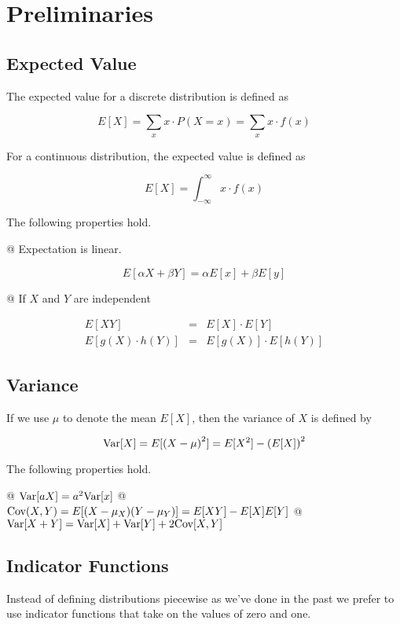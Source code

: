 \section{Preliminaries}
    \subsection{Expected Value}
    The expected value for a discrete distribution is defined as

    \[
        E[X] = \sum_{x} x \cdot P(X = x) = \sum_x x \cdot f(x)
    \]

    For a continuous distribution, the expected value is defined as

    \[
        E[X] = \int_{-\infty}^\infty x \cdot f(x)
    \]

    The following properties hold.

    \begin{easylist}[enumerate]
        @ Expectation is linear.

        \[
            E[\alpha X + \beta Y] = \alpha E[x] + \beta E[y]
        \]

        @ If $X$ and $Y$ are independent

        \[
            \begin{aligned}
                E[XY] &=& E[X] \cdot E[Y]\\
                E[g(X) \cdot h(Y)] &=& E[g(X)] \cdot E[h(Y)]
            \end{aligned}
        \]
    \end{easylist}

    \subsection{Variance}
    If we use $\mu$ to denote the mean $E[X]$, then the variance of $X$ is defined by

    \[
        \text{Var}[X] = E[{(X - \mu)}^2] = E[X^2] - {(E[X])}^2
    \]

    The following properties hold.

    \begin{easylist}[enumerate]
        @ $\text{Var}[a X] = a^2 \text{Var}[x]$
        @ $ \text{Cov}(X, Y) = E[(X - \mu_X)(Y - \mu_Y)] = E[XY] - E[X]E[Y] $
        @ $ \text{Var}[X + Y] = \text{Var}[X] + \text{Var}[Y] + 2 \text{Cov}[X, Y] $
    \end{easylist}

    \subsection{Indicator Functions}
    Instead of defining distributions piecewise as we've done in the past we prefer to use indicator functions
    that take on the values of zero and one.

